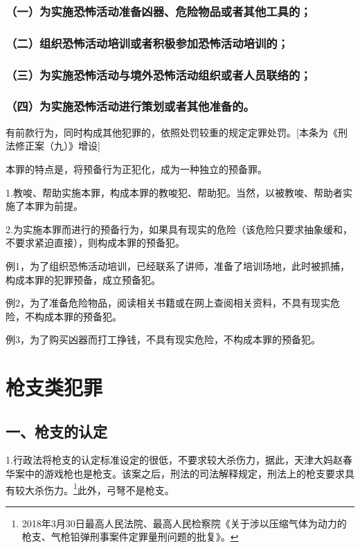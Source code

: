 \subsubsection*{（一）为实施恐怖活动准备凶器、危险物品或者其他工具的；}

\subsubsection*{（二）组织恐怖活动培训或者积极参加恐怖活动培训的；}

\subsubsection*{（三）为实施恐怖活动与境外恐怖活动组织或者人员联络的；}

\subsubsection*{（四）为实施恐怖活动进行策划或者其他准备的。}

有前款行为，同时构成其他犯罪的，依照处罚较重的规定定罪处罚。[本条为《刑法修正案（九）》增设]

本罪的特点是，将预备行为正犯化，成为一种独立的预备罪。

1.教唆、帮助实施本罪，构成本罪的教唆犯、帮助犯。当然，以被教唆、帮助者实施了本罪为前提。

2.为实施本罪而进行的预备行为，如果具有现实的危险（该危险只要求抽象缓和，不要求紧迫直接），则构成本罪的预备犯。

例1，为了组织恐怖活动培训，已经联系了讲师，准备了培训场地，此时被抓捕，构成本罪的犯罪预备，成立预备犯。

例2，为了准备危险物品，阅读相关书籍或在网上查阅相关资料，不具有现实危险，不构成本罪的预备犯。

例3，为了购买凶器而打工挣钱，不具有现实危险，不构成本罪的预备犯。

\section{枪支类犯罪}

\subsection*{一、枪支的认定}

1.行政法将枪支的认定标准设定的很低，不要求较大杀伤力，据此，天津大妈赵春华案中的游戏枪也是枪支。该案之后，刑法的司法解释规定，刑法上的枪支要求具有较大杀伤力。\footnote{2018年3月30日最高人民法院、最高人民检察院《关于涉以压缩气体为动力的枪支、气枪铅弹刑事案件定罪量刑问题的批复》。}此外，弓弩不是枪支。

